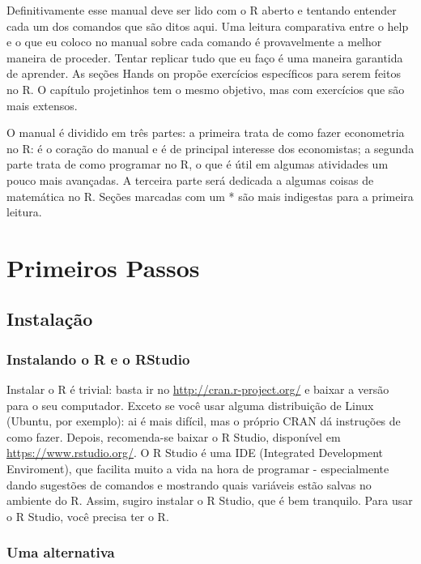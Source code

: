 \documentclass[]{book}
\begin{document}
Definitivamente esse manual deve ser lido com o R aberto e tentando
entender cada um dos comandos que são ditos aqui. Uma leitura
comparativa entre o help e o que eu coloco no manual sobre cada comando
é provavelmente a melhor maneira de proceder. Tentar replicar tudo que
eu faço é uma maneira garantida de aprender. As seções Hands on propõe
exercícios específicos para serem feitos no R. O capítulo projetinhos
tem o mesmo objetivo, mas com exercícios que são mais extensos.

O manual é dividido em três partes: a primeira trata de como fazer
econometria no R: é o coração do manual e é de principal interesse dos
economistas; a segunda parte trata de como programar no R, o que é útil
em algumas atividades um pouco mais avançadas. A terceira parte será
dedicada a algumas coisas de matemática no R. Seções marcadas com um *
são mais indigestas para a primeira leitura.

\chapter{Primeiros Passos}\label{primeiros-passos}

\section{Instalação}\label{instalacao}

\subsection{Instalando o R e o
RStudio}\label{instalando-o-r-e-o-rstudio}

Instalar o R é trivial: basta ir no \url{http://cran.r-project.org/} e
baixar a versão para o seu computador. Exceto se você usar alguma
distribuição de Linux (Ubuntu, por exemplo): ai é mais difícil, mas o
próprio CRAN dá instruções de como fazer. Depois, recomenda-se baixar o
R Studio, disponível em \url{https://www.rstudio.org/}. O R Studio é uma
IDE (Integrated Development Enviroment), que facilita muito a vida na
hora de programar - especialmente dando sugestões de comandos e
mostrando quais variáveis estão salvas no ambiente do R. Assim, sugiro
instalar o R Studio, que é bem tranquilo. Para usar o R Studio, você
precisa ter o R.

\subsection{Uma alternativa}\label{uma-alternativa}
\end{document}
